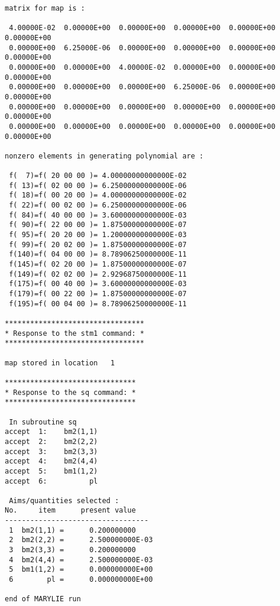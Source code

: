 \begin{footnotesize}
\begin{verbatim}
matrix for map is :

 4.00000E-02  0.00000E+00  0.00000E+00  0.00000E+00  0.00000E+00  0.00000E+00
 0.00000E+00  6.25000E-06  0.00000E+00  0.00000E+00  0.00000E+00  0.00000E+00
 0.00000E+00  0.00000E+00  4.00000E-02  0.00000E+00  0.00000E+00  0.00000E+00
 0.00000E+00  0.00000E+00  0.00000E+00  6.25000E-06  0.00000E+00  0.00000E+00
 0.00000E+00  0.00000E+00  0.00000E+00  0.00000E+00  0.00000E+00  0.00000E+00
 0.00000E+00  0.00000E+00  0.00000E+00  0.00000E+00  0.00000E+00  0.00000E+00

nonzero elements in generating polynomial are :

 f(  7)=f( 20 00 00 )= 4.00000000000000E-02
 f( 13)=f( 02 00 00 )= 6.25000000000000E-06
 f( 18)=f( 00 20 00 )= 4.00000000000000E-02
 f( 22)=f( 00 02 00 )= 6.25000000000000E-06
 f( 84)=f( 40 00 00 )= 3.60000000000000E-03
 f( 90)=f( 22 00 00 )= 1.87500000000000E-07
 f( 95)=f( 20 20 00 )= 1.20000000000000E-03
 f( 99)=f( 20 02 00 )= 1.87500000000000E-07
 f(140)=f( 04 00 00 )= 8.78906250000000E-11
 f(145)=f( 02 20 00 )= 1.87500000000000E-07
 f(149)=f( 02 02 00 )= 2.92968750000000E-11
 f(175)=f( 00 40 00 )= 3.60000000000000E-03
 f(179)=f( 00 22 00 )= 1.87500000000000E-07
 f(195)=f( 00 04 00 )= 8.78906250000000E-11

*********************************
* Response to the stm1 command: *
*********************************

map stored in location   1

*******************************
* Response to the sq command: *
*******************************

 In subroutine sq
accept  1:    bm2(1,1)
accept  2:    bm2(2,2)
accept  3:    bm2(3,3)
accept  4:    bm2(4,4)
accept  5:    bm1(1,2)
accept  6:          pl

 Aims/quantities selected :
No.     item      present value
----------------------------------
 1  bm2(1,1) =      0.200000000
 2  bm2(2,2) =      2.500000000E-03
 3  bm2(3,3) =      0.200000000
 4  bm2(4,4) =      2.500000000E-03
 5  bm1(1,2) =      0.000000000E+00
 6        pl =      0.000000000E+00

end of MARYLIE run
\end{verbatim}
\end{footnotesize}

